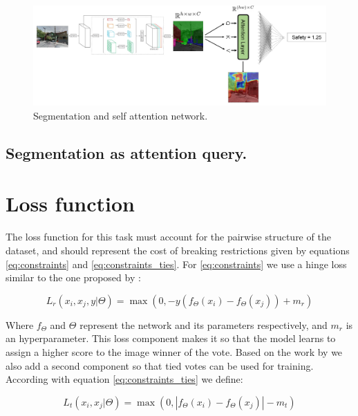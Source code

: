 \begin{figure}[ht]
	\begin{center}
	\includegraphics[width=1\textwidth]{./figures/self_attn.png}
	\caption[Self Attention network]{Segmentation and self attention network.}
	\label{fig:segrank_1}
	\end{center}
\end{figure}

\subsection{Segmentation as attention query.}

\section{Loss function} \label{section:loss}
The loss function for this task must account for the pairwise structure of the dataset,
and should represent the cost of breaking restrictions given by equations
\ref{eq:constraints} and \ref{eq:constraints_ties}. For \ref{eq:constraints} we use
a hinge loss similar to the one proposed by :

\begin{equation}
	L_r(x_i,x_j,y | \Theta) = \max(0, -y(f_\Theta(x_i) - f_\Theta(x_j)) + m_r)
	\label{eq:r_loss}
\end{equation}

Where $f_\Theta$ and $\Theta$  represent the network and its parameters respectively, and $m_r$
is an hyperparameter. This loss component makes it so that the model learns to assign a higher
score to the image winner of the vote. Based on the work by  we also add a second component so that tied votes can
be used for training. According with equation \ref{eq:constraints_ties} we define:

\begin{equation}
	L_t(x_i,x_j | \Theta) = \max(0, |f_\Theta(x_i) - f_\Theta(x_j)| - m_t)
	\label{eq:t_loss}
\end{equation}

